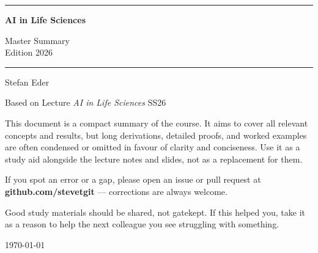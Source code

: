 \documentclass[11pt, oneside]{book}
\newcommand{\coursetitle}{AI in Life Sciences}
\newcommand{\documenttype}{Master Summary \\ Edition 2026}
\newcommand{\authorname}{Stefan Eder}
\newcommand{\basedon}{Based on Lecture \emph{AI in Life Sciences} SS26}
\begin{document}
\frontmatter  %


\thispagestyle{empty}
\vspace*{1.8cm}

\begin{center}
  {\color{accent}\rule{\linewidth}{1.8pt}}
  \vspace{0.65cm}

  {\fontsize{28}{34}\selectfont\bfseries\color{accent}\coursetitle\par}
  \vspace{0.25cm}
  {\large\color{gray!80!black}\documenttype\par}

  \vspace{0.55cm}
  {\color{accent!35}\rule{\linewidth}{0.5pt}}
  \vspace{0.55cm}

  {\large\authorname\par}
  \vspace{0.2cm}
  {\small\color{gray!70}\basedon\par}
\end{center}

\vspace{1.6cm}

\begin{center}
\begin{minipage}{0.84\textwidth}
  \small\color{gray!80!black}
  This document is a compact summary of the course.
  It aims to cover all relevant concepts and results, but long derivations,
  detailed proofs, and worked examples are often condensed or omitted in
  favour of clarity and conciseness.
  Use it as a study aid alongside the lecture notes and slides, not as a
  replacement for them.

  \medskip
  If you spot an error or a gap, please open an issue or pull request at
  \textbf{github.com/stevetgit} --- corrections are always welcome.

  \medskip
  \color{gray!60!black}
  Good study materials should be shared, not gatekept.
  If this helped you, take it as a reason to help the next colleague you see struggling with something.
\end{minipage}
\end{center}

\vfill
{\centering\small\color{gray!65} \today\par}
\clearpage
\end{document}
